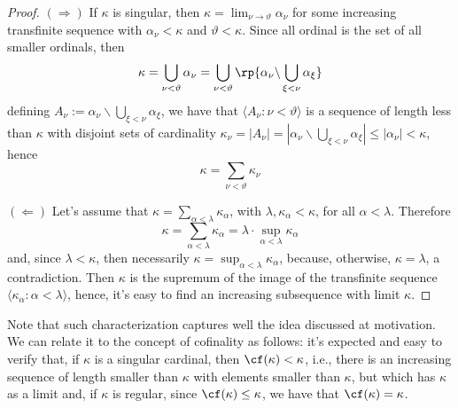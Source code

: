 \begin{proof}
    $(\Rightarrow)$ If $\kappa$ is singular, then $\kappa=\lim_{\nu\to\vartheta}\alpha_\nu$ for some increasing transfinite sequence with $\alpha_\nu<\kappa$ and $\vartheta<\kappa$. Since all ordinal is the set of all smaller ordinals, then
    $$\kappa=\bigcup_{\nu<\vartheta}\alpha_\nu=\bigcup_{\nu<\vartheta}\rp{\alpha_\nu\backslash\bigcup_{\xi<\nu}\alpha_\xi}$$
    defining $A_\nu:=\alpha_\nu\backslash\bigcup_{\xi<\nu}\alpha_\xi$, we have that $\langle A_\nu:\nu<\vartheta\rangle$ is a sequence of length less than $\kappa$ with disjoint sets of cardinality $\kappa_\nu=|A_\nu|=\left|\alpha_\nu\backslash\bigcup_{\xi<\nu}\alpha_\xi\right|\leq|\alpha_\nu|<\kappa$, hence
    $$\kappa=\sum_{\nu<\vartheta}\kappa_\nu$$
    
    $(\Leftarrow)$ Let's assume that $\kappa=\sum_{\alpha<\lambda}\kappa_\alpha$, with $\lambda,\kappa_\alpha<\kappa$, for all $\alpha<\lambda$. Therefore
    $$\kappa=\sum_{\alpha<\lambda}\kappa_\alpha=\lambda\cdot\sup_{\alpha<\lambda}\kappa_\alpha$$ and, since $\lambda<\kappa$, then necessarily $\kappa=\sup_{\alpha<\lambda}\kappa_\alpha$, because, otherwise, $\kappa=\lambda$, a contradiction. Then $\kappa$ is the supremum of the image of the transfinite sequence $\langle\kappa_\alpha:\alpha<\lambda\rangle$, hence, it's easy to find an increasing subsequence with limit $\kappa$.
\end{proof}

Note that such characterization captures well the idea discussed at motivation. We can relate it to the concept of cofinality as follows: it's expected and easy to verify that, if $\kappa$ is a singular cardinal, then $\cf(\kappa)<\kappa$, i.e., there is an increasing sequence of length smaller than $\kappa$ with elements smaller than $\kappa$, but which has $\kappa$ as a limit and, if $\kappa$ is regular, since $\cf(\kappa)\leq\kappa$, we have that $\cf(\kappa)=\kappa$.
